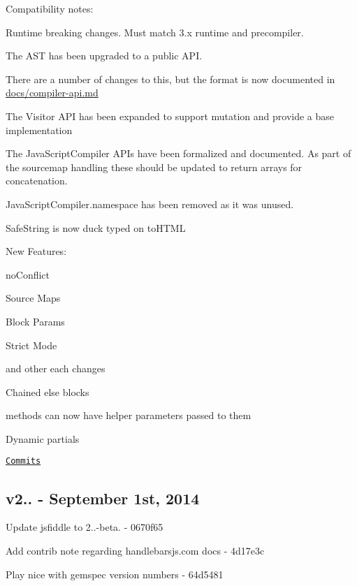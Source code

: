 Compatibility notes\+:
\begin{DoxyItemize}
\item Runtime breaking changes. Must match 3.\+x runtime and precompiler.
\item The A\+ST has been upgraded to a public A\+PI.
\begin{DoxyItemize}
\item There are a number of changes to this, but the format is now documented in \mbox{\hyperlink{compiler-api_8md}{docs/compiler-\/api.\+md}}
\item The Visitor A\+PI has been expanded to support mutation and provide a base implementation
\end{DoxyItemize}
\item The {\ttfamily Java\+Script\+Compiler} A\+P\+Is have been formalized and documented. As part of the sourcemap handling these should be updated to return arrays for concatenation.
\item {\ttfamily Java\+Script\+Compiler.\+namespace} has been removed as it was unused.
\item {\ttfamily Safe\+String} is now duck typed on {\ttfamily to\+H\+T\+ML}
\end{DoxyItemize}

New Features\+:
\begin{DoxyItemize}
\item no\+Conflict
\item Source Maps
\item Block Params
\item Strict Mode
\item and other each changes
\item Chained else blocks
\item methods can now have helper parameters passed to them
\item Dynamic partials
\end{DoxyItemize}

\href{https://github.com/wycats/handlebars.js/compare/v2.0.0...v3.0.0}{\tt Commits}

\subsection*{v2.. -\/ September 1st, 2014}


\begin{DoxyItemize}
\item Update jsfiddle to 2..-\/beta. -\/ 0670f65
\item Add contrib note regarding handlebarsjs.\+com docs -\/ 4d17e3c
\item Play nice with gemspec version numbers -\/ 64d5481
\end{DoxyItemize}

